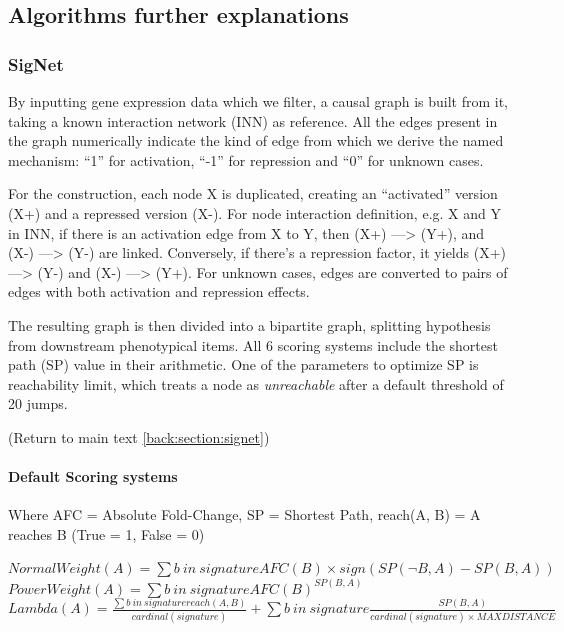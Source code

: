 \subsection{Algorithms further explanations}
\label{section:suppl:algorithms}

\subsubsection{SigNet}
\label{section:suppl:algorithms-signet}
By inputting gene expression data which we filter, a causal graph is built from it, taking a known interaction network (INN) as reference. All the edges present in the graph numerically indicate the kind of edge from which we derive the named mechanism: “1” for activation, “-1” for repression and “0” for unknown cases.

For the construction, each node X is duplicated, creating an “activated” version (X+) and a repressed version (X-). For node interaction definition, e.g. X and Y in INN, if there is an activation edge from X to Y, then (X+) —> (Y+), and (X-) —> (Y-) are linked. Conversely, if there’s a repression factor, it yields (X+) —> (Y-) and (X-) —> (Y+). For unknown cases, edges are converted to pairs of edges with both activation and repression effects.

The resulting graph is then divided into a bipartite graph, splitting hypothesis from downstream phenotypical items. All 6 scoring systems include the shortest path (SP) value in their arithmetic. One of the parameters to optimize SP is reachability limit, which treats a node as \textit{unreachable } after a default threshold of 20 jumps.

(Return to main text \ref{back:section:signet})

\paragraph{Default Scoring systems}
Where AFC = Absolute Fold-Change, SP = Shortest Path, reach(A, B) = A reaches B (True = 1, False = 0)

\begin{center}
    $NormalWeight(A) = \sum{b\ in\ signature} AFC(B) \times sign(SP(\neg B, A) - SP(B, A))$ \\    
    $PowerWeight(A) = \sum{b\ in\ signature} AFC(B)^{SP(B, A)}$ \\
    $Lambda(A) = \frac{\sum{b\ in\ signature} reach(A, B)}{cardinal(signature)} + \sum{b\ in\ signature} \frac{SP(B, A)}{cardinal(signature) \times MAXDISTANCE}$ \\
\end{center}